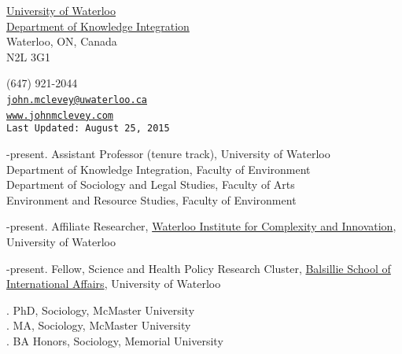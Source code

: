 \documentclass[9pt,usenames,dvipsnames]{article}
\makeatletter
\def\myemail{john.mclevey@uwaterloo.ca}
\def\myweb{www.johnmclevey.com}
\def\myphone{(647) 921-2044}
\def\lastupdated{Last Updated: August 25, 2015}
\makeatother
\begin{document}
\begin{minipage}[t]{2.95in}
 \flushright \footnotesize \href{https://uwaterloo.ca/}{University of Waterloo} \\  \href{https://uwaterloo.ca/knowledge-integration/faculty-mclevey}{Department of Knowledge Integration} \\ Waterloo, ON, Canada \\ N2L 3G1\\
  \end{minipage}
\hfill
\hfill
\begin{minipage}[t]{1.7in}
  \flushright \footnotesize \myphone\, \faPhone \\
  {\texttt{\href{mailto:\myemail}{\myemail}} \, \faEnvelope} \\
  {\texttt{\href{\myweb}{\myweb}} \, \faGlobe} \\
  {\texttt{\lastupdated}}\\
\end{minipage}


\bigskip

\reversemarginpar

\bigskip
{}
\smallskip
{}-present. Assistant Professor (tenure track), University of Waterloo \\
\noindent Department of Knowledge Integration, Faculty of Environment \\
\noindent Department of Sociology and Legal Studies, Faculty of Arts \\
\noindent Environment and Resource Studies, Faculty of Environment \\
\smallskip


-present. Affiliate Researcher, \href{http://wici.ca/new/}{Waterloo Institute for Complexity and Innovation}, University of Waterloo

-present. Fellow, Science and Health Policy Research Cluster, \href{http://www.balsillieschool.ca/}{Balsillie School of International Affairs}, University of Waterloo \\


. PhD, Sociology, McMaster University \\
. MA, Sociology, McMaster University \\
. BA Honors, Sociology, Memorial University \\
\end{document}
